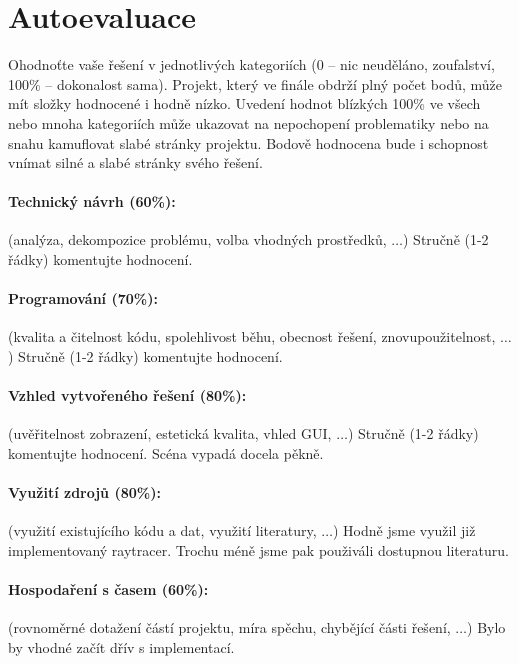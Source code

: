 \documentclass[11pt,a4paper]{article}
\begin{document}
\section{Autoevaluace}

Ohodnoťte vaše řešení v jednotlivých kategoriích (0 – nic neuděláno,
zoufalství, 100\% – dokonalost sama). Projekt, který ve finále obdrží plný
počet bodů, může mít složky hodnocené i hodně nízko. Uvedení hodnot blízkých
100\% ve všech nebo mnoha kategoriích může ukazovat na nepochopení problematiky
nebo na snahu kamuflovat slabé stránky projektu. Bodově hodnocena bude i
schopnost vnímat silné a slabé stránky svého řešení.

\paragraph{Technický návrh (60\%):} (analýza, dekompozice problému, volba
vhodných prostředků, $\ldots$) 
Stručně (1-2 řádky) komentujte hodnocení. 

\paragraph{Programování (70\%):} (kvalita a čitelnost kódu, spolehlivost běhu,
obecnost řešení, znovupoužitelnost, $\ldots$)
Stručně (1-2 řádky) komentujte hodnocení. 

\paragraph{Vzhled vytvořeného řešení (80\%):} (uvěřitelnost zobrazení,
estetická kvalita, vhled GUI, $\ldots$)
Stručně (1-2 řádky) komentujte hodnocení. 
Scéna vypadá docela pěkně.

\paragraph{Využití zdrojů (80\%):} (využití existujícího kódu a dat, využití
literatury, $\ldots$)
Hodně jsme využil již implementovaný raytracer. Trochu méně jsme pak použiváli dostupnou literaturu.

\paragraph{Hospodaření s časem (60\%):} (rovnoměrné dotažení částí projektu,
míra spěchu, chybějící části řešení, $\ldots$)
Bylo by vhodné začít dřív s implementací.
\end{document}
